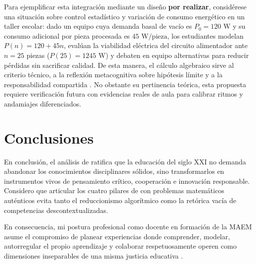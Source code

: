 \documentclass[spanish,letterpaper,oneside]{article}
\begin{document}
Para ejemplificar esta integración mediante un diseño \textbf{por realizar}, considérese una situación sobre control estadístico y variación de consumo energético en un taller escolar: dado un equipo cuya demanda basal de vacío es $P_0 = 120\text{ W}$ y su consumo adicional por pieza procesada es $45\text{ W/pieza}$, los estudiantes modelan $P(n) = 120 + 45n$, evalúan la viabilidad eléctrica del circuito alimentador ante $n = 25$ piezas ($P(25) = 1245\text{ W}$) y debaten en equipo alternativas para reducir pérdidas sin sacrificar calidad. De esta manera, el cálculo algebraico sirve al criterio técnico, a la reflexión metacognitiva sobre hipótesis límite y a la responsabilidad compartida \citep{sep2023pensamiento}. No obstante su pertinencia teórica, esta propuesta requiere verificación futura con evidencias reales de aula para calibrar ritmos y andamiajes diferenciados.

\clearpage
\section{Conclusiones}
En conclusión, el análisis de \citet{scott2015futuro2} ratifica que la educación del siglo XXI no demanda abandonar los conocimientos disciplinares sólidos, sino transformarlos en instrumentos vivos de pensamiento crítico, cooperación e innovación responsable. Considero que articular los cuatro pilares de \citet{delors1996educacion} con problemas matemáticos auténticos evita tanto el reduccionismo algorítmico como la retórica vacía de competencias descontextualizadas.

En consecuencia, mi postura profesional como docente en formación de la MAEM asume el compromiso de planear experiencias donde comprender, modelar, autorregular el propio aprendizaje y colaborar respetuosamente operen como dimensiones inseparables de una misma justicia educativa \citep{unesco2015replantear}.
\end{document}
